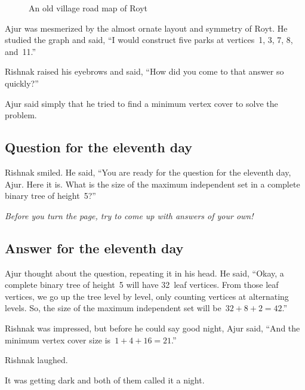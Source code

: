 \begin{figure}
\begin{center}

\caption{An old village road map of Royt}\label{13g6}
\end{center}
\end{figure}

Ajur was mesmerized by the almost ornate layout and symmetry of Royt. He studied the graph and said, ``I would construct five parks at vertices~1, 3, 7, 8, and~11.''

Rishnak raised his eyebrows and said, ``How did you come to that answer so quickly?''

Ajur said simply that he tried to find a minimum vertex cover to solve the problem.

\subsection*{Question for the eleventh day}
Rishnak smiled. He said, ``You are ready for the question for the eleventh day, Ajur. Here it is. What is the size of the maximum independent set in a complete binary tree of height~5?''

\textit{Before you turn the page, try to come up with answers of your own!}

\newpage
\subsection*{Answer for the eleventh day}
Ajur thought about the question, repeating it in his head. He said, ``Okay, a complete binary tree of height~5 will have 32~leaf vertices. From those leaf vertices, we go up the tree level by level, only counting vertices at alternating levels. So, the size of the maximum independent set will be~$32+8+2=42$.''

Rishnak was impressed, but before he could say good night, Ajur said, ``And the minimum vertex cover size is~$1+4+16=21$.''

Rishnak laughed.

It was getting dark and both of them called it a night.
